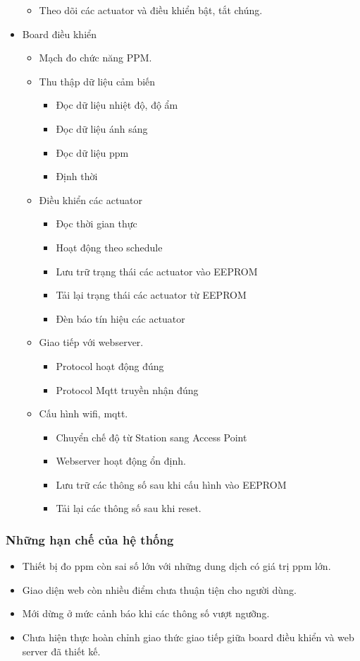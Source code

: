 \documentclass[a4paper,12pt,oneside]{article}
\begin{document}
\begin{itemize}
\begin{itemize}
			\item Theo dõi các actuator và điều khiển bật, tắt chúng. 
		\end{itemize}
	\item Board điều khiển
	\begin{itemize}
	\item Mạch đo chức năng PPM.
	\item Thu thập dữ liệu cảm biến
	\begin{itemize}
	\item Đọc dữ liệu nhiệt độ, độ ẩm
	\item Đọc dữ liệu ánh sáng
	\item Đọc dữ liệu ppm
	\item Định thời
	\end{itemize}
	\item Điều khiển các actuator
	\begin{itemize}
	\item Đọc thời gian thực
	\item Hoạt động theo schedule
	\item Lưu trữ trạng thái các actuator vào EEPROM
	\item Tải lại trạng thái các actuator từ EEPROM
	\item Đèn báo tín hiệu các actuator
	\end{itemize}
	\item Giao tiếp với webserver.
	\begin{itemize}
	\item Protocol hoạt động đúng
	\item Protocol Mqtt truyền nhận đúng
	\end{itemize}
	\item Cấu hình wifi, mqtt.
	\begin{itemize}

	\item Chuyển chế độ từ Station sang Access Point
	\item Webserver hoạt động ổn định.
	\item Lưu trữ các thông số sau khi cấu hình vào EEPROM
	\item Tải lại các thông số sau khi reset.
	\end{itemize}
	\end{itemize}
	\end{itemize}
	
	\subsubsection{Những hạn chế của hệ thống}
	\begin{itemize}
	\item Thiết bị đo ppm còn sai số lớn với những dung dịch có giá trị ppm lớn.
	\item Giao diện web còn nhiều điểm chưa thuận tiện cho người dùng.
	\item Mới dừng ở mức cảnh báo khi các thông số vượt ngưỡng.
	\item Chưa hiện thực hoàn chỉnh giao thức giao tiếp giữa board điều khiển và web server đã thiết kế.
	\end{itemize}		
	
\end{document}
